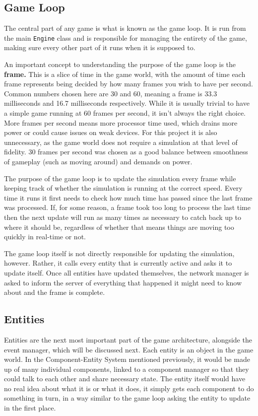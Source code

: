 \subsection{Game Loop}
The central part of any game is what is known as the game loop. It is run from the main \texttt{Engine} class and is responsible for managing the entirety of the game, making sure every other part of it runs when it is supposed to.

An important concept to understanding the purpose of the game loop is the \textbf{frame.} This is a slice of time in the game world, with the amount of time each frame represents being decided by how many frames you wish to have per second. Common numbers chosen here are 30 and 60, meaning a frame is 33.3 milliseconds and 16.7 milliseconds respectively. While it is usually trivial to have a simple game running at 60 frames per second, it isn't always the right choice. More frames per second means more processor time used, which drains more power or could cause issues on weak devices. For this project it is also unnecessary, as the game world does not require a simulation at that level of fidelity. 30 frames per second was chosen as a good balance between smoothness of gameplay (such as moving around) and demands on power.

The purpose of the game loop is to update the simulation every frame while keeping track of whether the simulation is running at the correct speed. Every time it runs it first needs to check how much time has passed since the last frame was processed. If, for some reason, a frame took too long to process the last time then the next update will run as many times as necessary to catch back up to where it should be, regardless of whether that means things are moving too quickly in real-time or not.

The game loop itself is not directly responsible for updating the simulation, however. Rather, it calls every entity that is currently active and asks it to update itself. Once all entities have updated themselves, the network manager is asked to inform the server of everything that happened it might need to know about and the frame is complete.

\subsection{Entities}\label{entities_design}
Entities are the next most important part of the game architecture, alongside the event manager, which will be discussed next. Each entity is an object in the game world. In the Component-Entity System mentioned previously, it would be made up of many individual components, linked to a component manager so that they could talk to each other and share necessary state. The entity itself would have no real idea about what it is or what it does, it simply gets each component to do something in turn, in a way similar to the game loop asking the entity to update in the first place.

